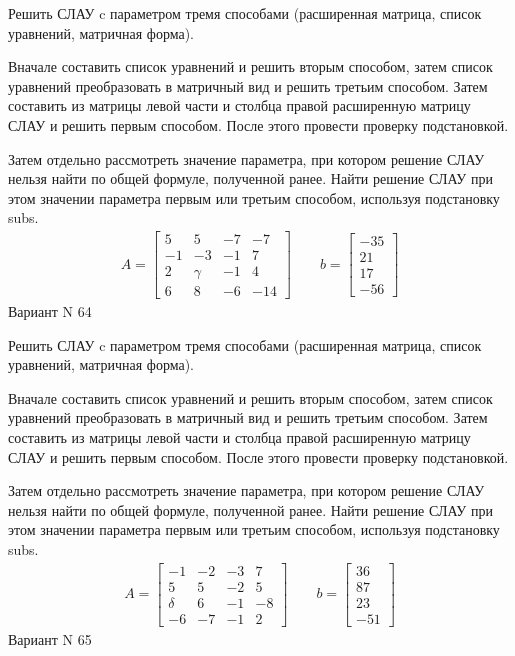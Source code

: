 \documentclass[11pt]{report}
\begin{document}
Решить СЛАУ c параметром тремя способами (расширенная матрица, список уравнений, матричная форма).

Вначале составить список уравнений и решить вторым способом,
затем список уравнений преобразовать в матричный вид и решить третьим способом.
Затем составить из матрицы левой части и столбца правой расширенную матрицу СЛАУ и решить первым способом.
После этого провести проверку подстановкой.

Затем отдельно рассмотреть значение параметра, при котором решение СЛАУ нельзя найти по общей формуле,
полученной ранее.
Найти решение СЛАУ при этом значении параметра первым или третьим способом, используя подстановку subs.
\begin{align*}
    A = \left[\begin{matrix}5 & 5 & -7 & -7\\-1 & -3 & -1 & 7\\2 & \gamma & -1 & 4\\6 & 8 & -6 & -14\end{matrix}\right]
\qquad b = \left[\begin{matrix}-35\\21\\17\\-56\end{matrix}\right]
\end{align*}
\newpage
Вариант N 64


Решить СЛАУ c параметром тремя способами (расширенная матрица, список уравнений, матричная форма).

Вначале составить список уравнений и решить вторым способом,
затем список уравнений преобразовать в матричный вид и решить третьим способом.
Затем составить из матрицы левой части и столбца правой расширенную матрицу СЛАУ и решить первым способом.
После этого провести проверку подстановкой.

Затем отдельно рассмотреть значение параметра, при котором решение СЛАУ нельзя найти по общей формуле,
полученной ранее.
Найти решение СЛАУ при этом значении параметра первым или третьим способом, используя подстановку subs.
\begin{align*}
    A = \left[\begin{matrix}-1 & -2 & -3 & 7\\5 & 5 & -2 & 5\\\delta & 6 & -1 & -8\\-6 & -7 & -1 & 2\end{matrix}\right]
\qquad b = \left[\begin{matrix}36\\87\\23\\-51\end{matrix}\right]
\end{align*}
\newpage
Вариант N 65
\end{document}

